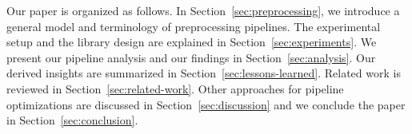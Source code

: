 Our paper is organized as follows.
In Section~\ref{sec:preprocessing}, we introduce a general model and terminology of preprocessing pipelines.
The experimental setup and the library design are explained in Section~\ref{sec:experiments}.
We present our pipeline analysis and our findings in Section~\ref{sec:analysis}.
Our derived insights are summarized in Section~\ref{sec:lessons-learned}.
Related work is reviewed in Section~\ref{sec:related-work}.
Other approaches for pipeline optimizations are discussed in Section~\ref{sec:discussion} and we conclude the paper in Section~\ref{sec:conclusion}.